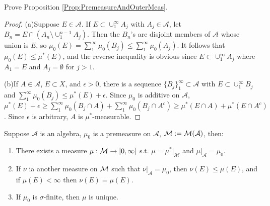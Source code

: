 \begin{exc}
    Prove Proposition \ref{Prop:PremeasureAndOuterMeas}.
\end{exc}
\begin{proof}
    (a)Suppose $E\in\mathcal{A}$. If $E\subset\cup_1^{\infty}A_j$ with $A_j\in\mathcal{A}$,
    let $B_n=E\cap(A_n\setminus\cup_1^{n-1}A_j)$. Then the $B_n$'s are disjoint members of $\mathcal{A}$
    whose union is $E$, so $\mu_{0}(E)=\sum_1^{\infty}\mu_{0}(B_j)\leq\sum_1^{\infty}\mu_{0}(A_j)$.
    It follows that $\mu_{0}(E)\leq\mu^*(E)$, and the reverse inequality is obvious since           
    $E\subset\cup_{1}^{\infty}A_j$ where $A_1=E$ and $A_j=\emptyset$ for $j>1$.

    (b)If $A\in\mathcal{A}$, $E\subset X$, and $\epsilon>0$, there is a sequence
    $\{B_j\}_{1}^{\infty}\subset\mathcal{A}$ with $E\subset\cup_{1}^{\infty}B_j$
    and $\sum_{1}^{\infty}\mu_{0}(B_j)\leq\mu^*(E)+\epsilon$. Since $\mu_0$ is additive
    on $\mathcal{A}$, 
    $\mu^*(E)+\epsilon\geq\sum_{1}^{\infty}\mu_{0}(B_j\cap A)+\sum_{1}^{\infty}\mu_{0}(B_j\cap A^c)
    \geq\mu^*(E\cap A)+\mu^*(E\cap A^c)$. Since $\epsilon$ is arbitrary, $A$ is $\mu^*$-measurable.
\end{proof}
\begin{thm}
    \label{Thm:PremeasureExtension}
    Suppose $\mathcal{A}$ is an algebra, $\mu_{0}$ is a premeasure on 
    $\mathcal{A}$, $\mathcal{M}:=\mathcal{M}(\mathcal{A})$, then:
    \begin{enumerate}
        \item There exists a measure $\mu:\mathcal{M}\rightarrow[0,\infty]$ 
        s.t. $\mu=\mu^{*}|_{\mathcal{M}}$ and $\mu|_{\mathcal{A}}
        =\mu_{0}.$
        \item If $\nu$ ia another measure on $\mathcal{M}$ such that 
        $\nu|_{\mathcal{A}}=\mu_{0}$, then $\nu(E)\le\mu(E)$, 
        and if $\mu(E)<\infty$ then $\nu(E)=\mu(E)$.
        \item If $\mu_{0}$ is $\sigma$-finite, then $\mu$ is unique.
    \end{enumerate}
\end{thm}
